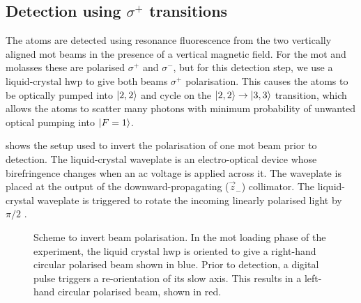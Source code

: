 \subsection{Detection using \(\sigma^+\) transitions}\label{subsec:photodiode_setup}
The atoms are detected using resonance fluorescence from the two
vertically aligned \ac{mot} beams in the presence of a vertical
magnetic field. For the \ac{mot} and molasses these are polarised
$\sigma^+$ and $\sigma^-$, but for this detection step, we use a
liquid-crystal \ac{hwp} to give both beams $\sigma^+$ polarisation.
This causes the atoms to be optically pumped into \(\ket{2,2}\) and cycle on the
\(\ket{2,2} \rightarrow \ket{3,3}\) transition, which allows the atoms
to scatter many photons with minimum probability of unwanted optical
pumping into $\ket{F=1}$.
\par\noindent
{} shows the setup used to invert the
polarisation of one \ac{mot} beam prior to detection. The liquid-crystal
waveplate is an electro-optical device whose birefringence changes
when an ac voltage is applied across it. The waveplate is placed at
the output of the downward-propagating (\(\vec{z}_-\))
collimator. The liquid-crystal waveplate is triggered to rotate the
incoming linearly polarised light by $\pi/2$ \sivalue{}{\radian}. 
\begin{figure}[!htpb]
    \centering
    \fontsize{14pt}{14pt}
    \resizebox{0.5\textwidth}{!}{}
    \caption[Scheme to invert beam polarisation.]{Scheme to invert
      beam polarisation. In the \ac{mot} loading phase of the
      experiment, the liquid crystal \ac{hwp} is oriented to give a
      right-hand circular polarised beam shown in blue. Prior to
      detection, a digital pulse triggers a re-orientation of its slow
      axis. This results in a left-hand circular polarised beam, shown
      in red.}\label{fig:detection_scheme}
\end{figure}
